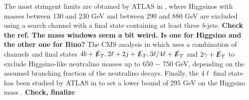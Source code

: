 \documentclass[a4paper,11pt]{article}
\newcommand{\Shufang}[1]{{\bf\color{Maroon}  #1}}
\begin{document}
The most stringent limits are obtained by ATLAS in \cite{Aaboud:2018htj},
where Higgsinos with masses between 130 and 230 GeV and between 290 and 880 
GeV are excluded using a search channel with a final state containing at least
three \emph{b}-jets.  \Shufang{Check the ref.  The mass windows seem a bit weird.  Is one for Higgsino and the other one for Bino?}  The CMS analysis
in \cite{Sirunyan:2017ubx} which uses a combination of channels and final states 
$4b+\slashed{E}_T, 2\ell + 2j + \slashed{E}_T, 3\ell/4\ell+ \slashed{E}_T$ and $2\gamma+\slashed{E}_T$ 
to exclude Higgsino-like neutralino masses up to 650 $-$ 750 GeV, depending on the assumed branching 
fraction of the neutralino decays. Finally, the $4\ell$ final state has been studied by ATLAS in \cite{Aaboud:2018zeb}
to set a lower bound of 295 GeV on the Higgsino mass  \cite{Aaboud:2018zeb}.
\Shufang{Check, finalize}

\end{document}
